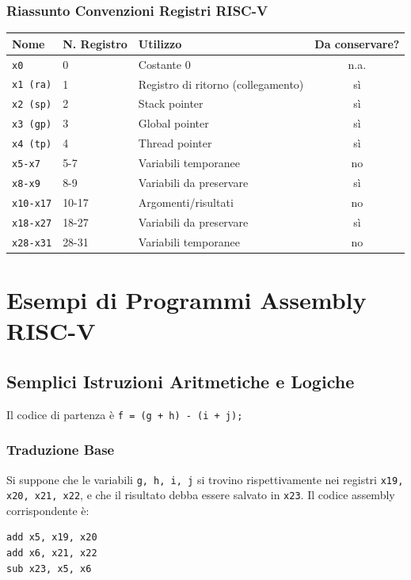 \documentclass[12pt, a4paper]{article}
\begin{document}
\subsubsection{Riassunto Convenzioni Registri RISC-V}
\begin{table}[ht!]
\centering
\begin{tabular}{lllc}
\toprule
\textbf{Nome} & \textbf{N. Registro} & \textbf{Utilizzo} & \textbf{Da conservare?} \\
\midrule
\texttt{x0} & 0 & Costante 0 & n.a. \\
\texttt{x1 (ra)} & 1 & Registro di ritorno (collegamento) & sì \\
\texttt{x2 (sp)} & 2 & Stack pointer & sì \\
\texttt{x3 (gp)} & 3 & Global pointer & sì \\
\texttt{x4 (tp)} & 4 & Thread pointer & sì \\
\texttt{x5-x7} & 5-7 & Variabili temporanee & no \\
\texttt{x8-x9} & 8-9 & Variabili da preservare & sì \\
\texttt{x10-x17} & 10-17 & Argomenti/risultati & no \\
\texttt{x18-x27} & 18-27 & Variabili da preservare & sì \\
\texttt{x28-x31} & 28-31 & Variabili temporanee & no \\
\bottomrule
\end{tabular}
\end{table}

\section{Esempi di Programmi Assembly RISC-V}
\subsection{Semplici Istruzioni Aritmetiche e Logiche}
Il codice di partenza è \texttt{f = (g + h) - (i + j);}
\subsubsection{Traduzione Base}
Si suppone che le variabili \texttt{g, h, i, j} si trovino rispettivamente nei registri \texttt{x19, x20, x21, x22}, e che il risultato debba essere salvato in \texttt{x23}. Il codice assembly corrispondente è:
\begin{verbatim}
add x5, x19, x20
add x6, x21, x22
sub x23, x5, x6
\end{verbatim}
\end{document}
